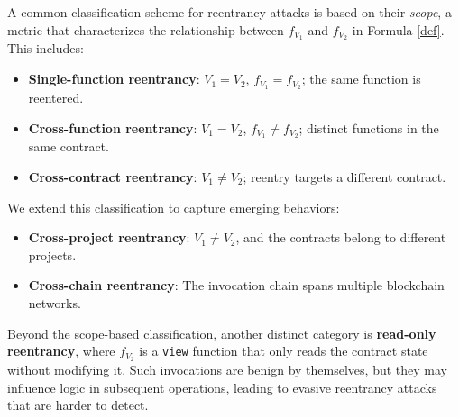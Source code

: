 A common classification scheme for reentrancy attacks is based on their \textit{scope}, a metric that characterizes the relationship between $f_{V_1}$ and $f_{V_2}$ in Formula \ref{def}. This includes:

\begin{itemize}
    \item \textbf{Single-function reentrancy}: $V_1 = V_2$, $f_{V_1} = f_{V_2}$; the same function is reentered.
    \item \textbf{Cross-function reentrancy}: $V_1 = V_2$, $f_{V_1} \neq f_{V_2}$; distinct functions in the same contract.
    \item \textbf{Cross-contract reentrancy}: $V_1 \neq V_2$; reentry targets a different contract.
\end{itemize}

We extend this classification to capture emerging behaviors:

\begin{itemize}
    \item \textbf{Cross-project reentrancy}: $V_1 \neq V_2$, and the contracts belong to different projects.
    \item \textbf{Cross-chain reentrancy}: The invocation chain spans multiple blockchain networks.
\end{itemize}

Beyond the scope-based classification, another distinct category is \textbf{read-only reentrancy}, where $f_{V_2}$ is a \lstinline{view} function that only reads the contract state without modifying it. Such invocations are benign by themselves, but they may influence logic in subsequent operations, leading to evasive reentrancy attacks that are harder to detect.